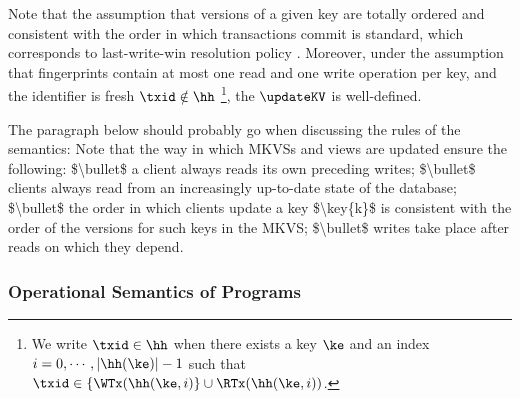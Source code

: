 Note that the assumption that 
versions of a given key are totally ordered and consistent with the order in which 
transactions commit is standard, 
which corresponds to last-write-win resolution policy \cite{adya,framework-concur,seebelieve}. 
Moreover, under the assumption that fingerprints contain at most one read and one write 
operation per key, and the identifier is fresh $\txid \notin \hh$%
\footnote{%
We write $\txid \in \hh$ when there exists a key 
$\ke$ and an index $i=0,\cdots, \lvert \hh(\ke) \rvert -1$ such that $\txid \in \{\WTx(\hh(\ke, i)\} \cup \RTx(\hh(\ke, i))$.}, 
the $\updateKV$ is well-defined.





\ac{The paragraph below should probably go when discussing the rules of the semantics:

Note that the way in which MKVSs and views are updated ensure the following: 
$\bullet$ a client always reads its own preceding writes; 
$\bullet$ clients always read from an increasingly up-to-date state of the database; 
$\bullet$ the order in which clients update a key $\key{k}$ is consistent with the 
order of the versions for such keys in the MKVS; 
$\bullet$ writes take place after reads on which they depend. 
}









\subsubsection{Operational Semantics of Programs}




